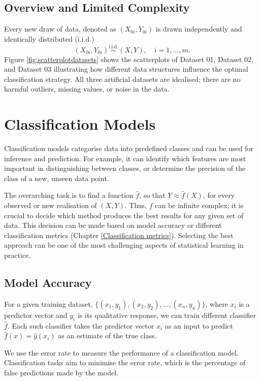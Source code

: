 \documentclass[12pt,a4paper,titlepage]{article}
\numberwithin{equation}{section}
\numberwithin{table}{section}
\numberwithin{figure}{section}
\begin{document}
    \subsection{Overview and Limited Complexity}
    Every new draw of data, denoted as $(X_{0i},Y_{0i})$ is drawn independently and identically distributed (i.i.d.)
    \begin{equation*}
    (X_{0i},Y_{0i})\overset{\text{i.i.d.}}{\sim}(X,Y),\quad i=1,\dots,m.
    \end{equation*}
    Figure \ref{fig:scatterplotdatasets} shows the scatterplots of Dataset 01, Dataset 02, and Dataset 03 illustrating how different data structures influence the optimal classification strategy. All three artificial datasets are idealised; there are no harmful outliers, missing values, or noise in the data.

\section{Classification Models}\label{Model}
Classification models categorise data into predefined classes and can be used for inference and prediction. For example, it can identify which features are most important in distinguishing between classes, or determine the precision of the class of a new, unseen data point.

\noindent The overarching task is to find a function $\hat{f}$, so that $Y \approx \hat{f}(X)$, for every observed or new realisation of $(X,Y)$. Thus, $f$ can be infinite complex; it is crucial to decide which method produces the best results for any given set of data. This decision can be made based on model accuracy or different classification metrics (Chapter \ref{Classification metrics}).
Selecting the best approach can be one of the most challenging aspects of statistical learning in practice.

    \subsection{Model Accuracy}\label{Model Accuracy}
    For a given training dataset, $\{(x_1,y_1),(x_2,y_2), ..., (x_n,y_n)\}$, where $x_i$ is a predictor vector and $y_i$ is its qualitative response, we can train different classifier $\hat{f}$. Each such classifier takes the predictor vector $x_i$ as an input to predict $\hat{f}(x)=\hat{y}(x_i)$ as an estimate of the true class.
    
    \noindent We use the error rate to measure the performance of a classification model. Classification tasks aim to minimise the error rate, which is the percentage of false predictions made by the model.
\end{document}
